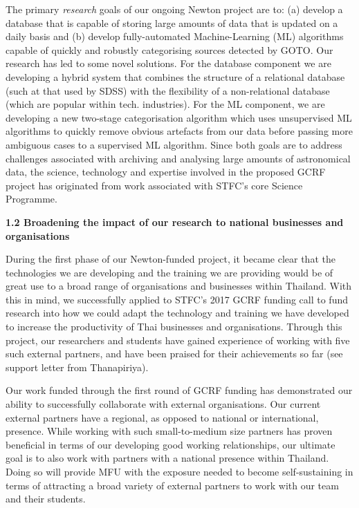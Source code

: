 \documentclass[11pt]{article}
\begin{document}
  The primary {\it research} goals of our ongoing Newton project are to: (a) develop a database that is capable of storing large amounts of data that is updated on a daily basis and (b) develop fully-automated Machine-Learning (ML) algorithms capable of quickly and robustly categorising sources detected by GOTO. Our research has led to some novel solutions. For the database component we are developing a hybrid system that combines the structure of a relational database (such at that used by SDSS) with the flexibility of a non-relational database (which are popular within tech. industries). For the ML component, we are developing a new two-stage categorisation algorithm which uses unsupervised ML algorithms to quickly remove obvious artefacts from our data before passing more ambiguous cases to a supervised ML algorithm. Since both goals are to address challenges associated with archiving and analysing large amounts of astronomical data, the science, technology and expertise involved in the proposed GCRF project has originated from work associated with STFC's core Science Programme. 
  
  \vspace{3mm}
  \noindent
  {\large \bf 1.2 Broadening the impact of our research to national businesses and organisations}
  
  \noindent
  During the first phase of our Newton-funded project, it became clear that the technologies we are developing and the training we are providing would be of great use to a broad range of organisations and businesses within Thailand. With this in mind, we successfully applied to STFC's 2017 GCRF funding call to fund research into how we could adapt the technology and training we have developed to increase the productivity of Thai businesses and organisations. Through this project, our researchers and students have gained experience of working with five such external partners, and have been praised for their achievements so far (see support letter from Thanapiriya).
  
  \vspace{2mm}
  \noindent
  Our work funded through the first round of GCRF funding has demonstrated our ability to successfully collaborate with external organisations. Our current external partners have a regional, as opposed to national or international, presence. While working with such small-to-medium size partners has proven beneficial in terms of our developing good working relationships, our ultimate goal is to also work with partners with a national presence within Thailand. Doing so will provide MFU with the exposure needed to become self-sustaining in terms of attracting a broad variety of external partners to work with our team and their students.
\end{document}
